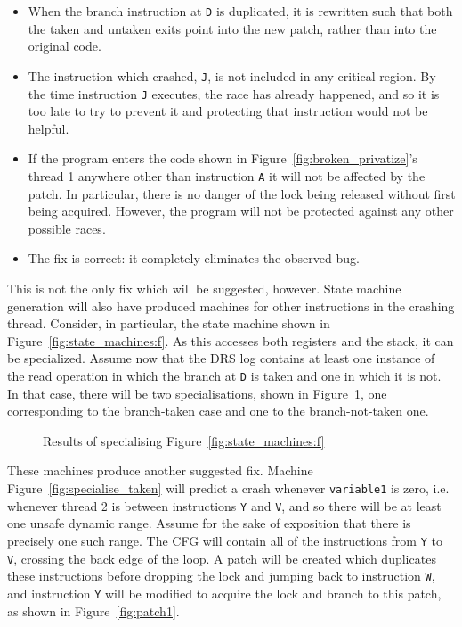 \documentclass[10pt,letter,twocolumn]{sigplanconf}
\begin{document}
\begin{itemize}
\item When the branch instruction at \verb|D| is duplicated, it is
  rewritten such that both the taken and untaken exits point into the
  new patch, rather than into the original code.
\item The instruction which crashed, \verb|J|, is not included in any
  critical region.  By the time instruction \verb|J| executes, the
  race has already happened, and so it is too late to try to prevent
  it and protecting that instruction would not be helpful.
\item If the program enters the code shown in
  Figure~\ref{fig:broken_privatize}'s thread 1 anywhere other than
  instruction \verb|A| it will not be affected by the patch.  In
  particular, there is no danger of the lock being released without
  first being acquired.  However, the program will not be protected
  against any other possible races.
\item The fix is correct: it completely eliminates the observed bug.
\end{itemize}

This is not the only fix which will be suggested, however.  State
machine generation will also have produced machines for other
instructions in the crashing thread.  Consider, in particular, the
state machine shown in Figure~\ref{fig:state_machines:f}.  As this
accesses both registers and the stack, it can be specialized.  Assume
now that the DRS log contains at least one instance of the read
operation in which the branch at \verb|D| is taken and one in which it
is not.  In that case, there will be two specialisations, shown in
Figure~\ref{fig:example_specialisations}, one corresponding to the
branch-taken case and one to the branch-not-taken one.

\begin{figure}[thb]
\caption{Results of specialising Figure~\ref{fig:state_machines:f}}
\label{fig:example_specialisations}
\end{figure}

These machines produce another suggested fix.  Machine
Figure~\ref{fig:specialise_taken} will predict a crash whenever
\verb|variable1| is zero, i.e. whenever thread 2 is between
instructions \verb|Y| and \verb|V|, and so there will be at least one
unsafe dynamic range.  Assume for the sake of exposition that there is
precisely one such range.  The CFG will contain all of the
instructions from \verb|Y| to \verb|V|, crossing the back edge of the
loop.  A patch will be created which duplicates these instructions
before dropping the lock and jumping back to instruction \verb|W|, and
instruction \verb|Y| will be modified to acquire the lock and branch
to this patch, as shown in Figure~\ref{fig:patch1}.
\end{document}
